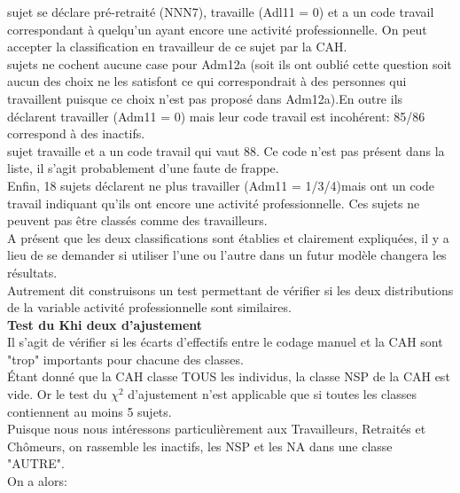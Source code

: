 \documentclass{book}
\begin{document}
\bigskip

 sujet se déclare pré-retraité (NNN7), travaille (Adl11 = 0) et a un code travail correspondant à quelqu'un ayant encore une activité professionnelle. On peut accepter la classification en travailleur de ce sujet par la CAH.\\

 sujets ne cochent aucune case pour Adm12a (soit ils ont oublié cette question soit aucun des choix ne les satisfont ce qui correspondrait à des personnes qui travaillent puisque ce choix n'est pas proposé dans Adm12a).En outre ils déclarent travailler (Adm11 = 0) mais leur code travail est incohérent: 85/86 correspond à des inactifs.\\

 sujet travaille et a un code travail qui vaut 88. Ce code n'est pas présent dans la liste, il s'agit probablement d'une faute de frappe.\\

\noindent
Enfin, 18 sujets déclarent ne plus travailler (Adm11 = 1/3/4)mais ont un code travail indiquant qu'ils ont encore une activité professionnelle. Ces sujets ne peuvent pas être classés comme des travailleurs.\\

\noindent
A présent que les deux classifications sont établies et clairement expliquées, il y a lieu de se demander si utiliser l'une ou l'autre dans un futur modèle changera les résultats.\\
Autrement dit construisons un test permettant de vérifier si les deux distributions de la variable activité professionnelle sont similaires.\\

\noindent
\textbf{Test du Khi deux d'ajustement}\\
Il s'agit de vérifier si les écarts d'effectifs entre le codage manuel et la CAH sont "trop" importants pour chacune des classes.\\
Étant donné que la CAH classe TOUS les individus, la classe NSP de la CAH est vide.
Or le test du $\chi^2$ d'ajustement n'est applicable que si toutes les classes contiennent au moins 5 sujets.\\
Puisque nous nous intéressons particulièrement aux Travailleurs, Retraités et Chômeurs, on rassemble les inactifs, les NSP et les NA dans une classe "AUTRE".\\
\noindent
On a alors:\\
\end{document}
